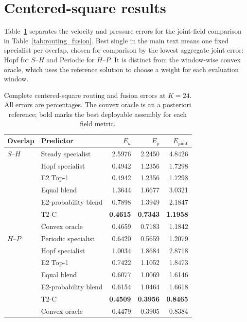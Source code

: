 \section{Centered-square results}
\label{app:square}

Table~\ref{tab:square_fusion_full} separates the velocity and pressure errors
for the joint-field comparison in Table~\ref{tab:routing_fusion}. Best single
in the main text means one fixed specialist per overlap, chosen for comparison
by the lowest aggregate joint error: Hopf for $S$--$H$ and Periodic for $H$--$P$.
It is distinct from the window-wise convex oracle, which uses the reference
solution to choose a weight for each evaluation window.

\begin{table}[!htbp]
\centering
\caption{Complete centered-square routing and fusion errors at $K=24$.
All errors are percentages. The convex oracle is an a posteriori reference;
bold marks the best deployable assembly for each field metric.}
\label{tab:square_fusion_full}
\small
\setlength{\tabcolsep}{5pt}
\begin{tabular}{@{}llrrr@{}}
\toprule
Overlap & Predictor & $E_u$ & $E_p$ & $E_{\mathrm{joint}}$ \\
\midrule
$S$--$H$ & Steady specialist & 2.5976 & 2.2450 & 4.8426 \\
 & Hopf specialist & 0.4942 & 1.2356 & 1.7298 \\
 & E2 Top-1 & 0.4942 & 1.2356 & 1.7298 \\
 & Equal blend & 1.3644 & 1.6677 & 3.0321 \\
 & E2-probability blend & 0.7898 & 1.3949 & 2.1847 \\
 & T2-C & \textbf{0.4615} & \textbf{0.7343} & \textbf{1.1958} \\
 & Convex oracle & 0.4659 & 0.7183 & 1.1842 \\
\midrule
$H$--$P$ & Periodic specialist & 0.6420 & 0.5659 & 1.2079 \\
 & Hopf specialist & 1.0034 & 1.8684 & 2.8718 \\
 & E2 Top-1 & 0.7422 & 1.1052 & 1.8473 \\
 & Equal blend & 0.6077 & 1.0069 & 1.6146 \\
 & E2-probability blend & 0.6154 & 1.0464 & 1.6618 \\
 & T2-C & \textbf{0.4509} & \textbf{0.3956} & \textbf{0.8465} \\
 & Convex oracle & 0.4479 & 0.3905 & 0.8384 \\
\bottomrule
\end{tabular}
\end{table}

